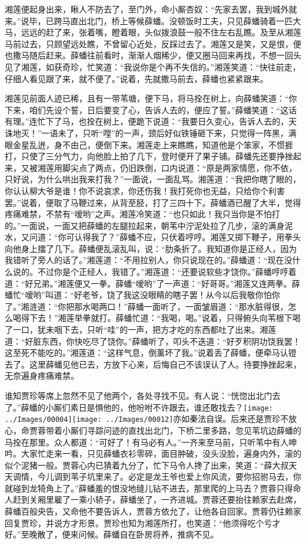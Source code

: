 湘莲便起身出来，瞅人不防去了，至门外，命小厮杏奴：``先家去罢，我到城外就来。''说毕，已跨马直出北门，桥上等候薛蟠。没顿饭时工夫，只见薛蟠骑着一匹大马，远远的赶了来，张着嘴，瞪着眼，头似拨浪鼓一般不住左右乱瞧。及至从湘莲马前过去，只顾望远处瞧，不曾留心近处，反踩过去了。湘莲又是笑，又是恨，便也撒马随后赶来。薛蟠往前看时，渐渐人烟稀少，便又圈马回来再找，不想一回头见了湘莲，如获奇珍，忙笑道：``我说你是个再不失信的。''湘莲笑道：``快往前走，仔细人看见跟了来，就不便了。''说着，先就撒马前去，薛蟠也紧紧跟来。

湘莲见前面人迹已稀，且有一带苇塘，便下马，将马拴在树上，向薛蟠笑道：``你下来，咱们先设个誓，日后要变了心，告诉人去的，便应了誓。''薛蟠笑道：``这话有理。''连忙下了马，也拴在树上，便跪下说道：``我要日久变心，告诉人去的，天诛地灭！''一语未了，只听``嘡''的一声，颈后好似铁锤砸下来，只觉得一阵黑，满眼金星乱迸，身不由己，便倒下来。湘莲走上来瞧瞧，知道他是个笨家，不惯捱打，只使了三分气力，向他脸上拍了几下，登时便开了果子铺。薛蟠先还要挣挫起来，又被湘莲用脚尖点了两点，仍旧跌倒，口内说道：``原是两家情愿，你不依，只好说，为什么哄出我来打我？''一面说，一面乱骂。湘莲道：``我把你瞎了眼的，你认认柳大爷是谁！你不说哀求，你还伤我！我打死你也无益，只给你个利害罢。''说着，便取了马鞭过来，从背至胫，打了三四十下。薛蟠酒已醒了大半，觉得疼痛难禁，不禁有``嗳哟''之声。湘莲冷笑道：``也只如此！我只当你是不怕打的。''一面说，一面又把薛蟠的左腿拉起来，朝苇中泞泥处拉了几步，滚的满身泥水，又问道：``你可认得我了？''薛蟠不应，只伏着哼哼。湘莲又掷下鞭子，用拳头向他身上擂了几下。薛蟠便乱滚乱叫，说：``肋条折了。我知道你是正经人，因为我错听了旁人的话了。''湘莲道：``不用拉别人，你只说现在的。''薛蟠道：``现在没什么说的。不过你是个正经人，我错了。''湘莲道：``还要说软些才饶你。''薛蟠哼哼着道：``好兄弟。''湘莲便又一拳。薛蟠``嗳哟''了一声道：``好哥哥。''湘莲又连两拳。薛蟠忙``嗳哟''叫道：``好老爷，饶了我这没眼睛的瞎子罢！从今以后我敬你怕你了。''湘涟道：``你把那水喝两口！''薛蟠一面听了，一面皱眉道：``那水脏得很，怎么喝得下去！''湘莲举拳就打。薛蟠忙道：``我喝，喝。''说着，只得俯头向苇根下喝了一口，犹未咽下去，只听``哇''的一声，把方才吃的东西都吐了出来。湘莲道：``好脏东西，你快吃尽了饶你。''薛蟠听了，叩头不迭道：``好歹积阴功饶我罢！这至死不能吃的。''湘莲道：``这样气息，倒薰坏了我。''说着丢了薛蟠，便牵马认镫去了。这里薛蟠见他已去，方放下心来，后悔自己不该误认了人。待要挣挫起来，无奈遍身疼痛难禁。

谁知贾珍等席上忽然不见了他两个，各处寻找不见。有人说：``恍惚出北门去了。''薛蟠的小厮们素日是惧他的，他吩咐不许跟去，谁还敢找去？{\texttt{[image: ../Images/00004]}\texttt{[image: ../Images/00012]}\footnotesize \kaishu 亦如秦法自误。}后来还是贾珍不放心，命贾蓉带着小厮们寻踪问迹的直找出北门，下桥二里多路，忽见苇坑边薛蟠的马拴在那里。众人都道：``可好了！有马必有人。''一齐来至马前，只听苇中有人呻吟。大家忙走来一看，只见薛蟠衣衫零碎，面目肿破，没头没脸，遍身内外，滚的似个泥猪一般。贾蓉心内已猜着九分了，忙下马令人搀了出来，笑道：``薛大叔天天调情，今儿调到苇子坑里来了。必定是龙王爷也爱上你风流，要你招驸马去，你就碰到龙犄角上了。''薛蟠羞的恨没地缝儿钻不进去，那里爬的上马去？贾蓉只得命人赶到关厢里雇了一乘小轿子，薛蟠坐了，一齐进城。贾蓉还要抬往赖家去赴席，薛蟠百般央告，又命他不要告诉人，贾蓉方依允了，让他各自回家。贾蓉仍往赖家回复贾珍，并说方才形景。贾珍也知为湘莲所打，也笑道：``他须得吃个亏才好。''至晚散了，便来问候。薛蟠自在卧房将养，推病不见。

